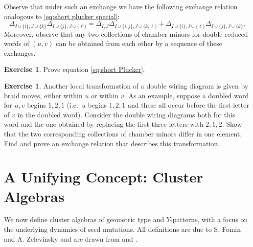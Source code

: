 \documentclass{amsart}
\theoremstyle{definition}
\newtheorem{example}[theorem]{Example}
\newtheorem{exercise}[theorem]{Exercise}
\theoremstyle{remark}
\numberwithin{equation}{section}
\begin{document}
    Observe that under such an exchange we have the following exchange relation analogous to \eqref{eq:short plucker special}:
    \begin{equation}\label{eq:short Plucker}
      \Delta_{I\cup\{i\},J\cup\{k\}}\Delta_{I\cup\{j\},J\cup\{\ell\}}=\Delta_{I,J}\Delta_{I\cup\{i,j\},J\cup\{k,\ell\}}+\Delta_{I\cup\{i\},J\cup\{\ell\}}\Delta_{I\cup\{j\},J\cup\{k\}}.
    \end{equation}
    Moreover, observe that any two collections of chamber minors for double reduced words of $(u,v)$ can be obtained from each other by a sequence of these exchanges.
    \begin{exercise}
      Prove equation \eqref{eq:short Plucker}.
    \end{exercise}
		
		\begin{exercise}
		Another local transformation of a double wiring diagram is given by braid moves, either within $u$ or within $v$.  As an example, suppose a doubled word for $u,v$ begins $1,2,1$ (i.e.\ $u$ begins $1,2,1$ and these all occur before the first letter of $v$ in the doubled word).  Consider the double wiring diagrams both for this word and the one obtained by replacing the first three letters with $2,1,2$.  Show that the two corresponding collections of chamber minors differ in one element.  Find and prove an exchange relation that describes this transformation.
		\end{exercise}



\section{A Unifying Concept: Cluster Algebras}\label{sec:cluster_algebras}
	We now define cluster algebras of geometric type and $Y$-patterns, with a focus on the underlying dynamics of seed mutations. All definitions are due to S. Fomin and A. Zelevinsky and are drawn from \cite{FZ02} and \cite{FZ07}.
	
\end{document}
